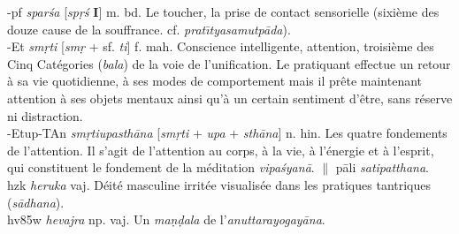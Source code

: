 \documentclass[a4paper,11pt,twocolumn]{article}
\begin{document}
{\dn -pf\0} {\em spar\'{s}a} [{\em sp\d{r}\'{s}} {\bf I}] m. bd. \og Le
toucher\fg, la prise de contact sensorielle (sixième des douze cause de
la souffrance. cf. {\em prat\={\i}tyasamutp\={a}da}). \\

{\dn -Et} {\em sm\d{r}ti} [{\em sm\d{r}} + sf. {\em ti}]
f. mah. \og Conscience intelligente, attention\fg, troisième des Cinq
Catégories ({\em bala}) de la voie de l'unification. Le
pratiquant effectue un retour à sa vie quotidienne, à ses modes de
comportement mais il prête maintenant attention à ses objets
mentaux ainsi qu'à un certain sentiment d'être, sans réserve ni
distraction. \\

{\dn -Etup-TAn} {\em sm\d{r}tiupasth\={a}na} [{\em sm\d{r}ti} +
{\em upa} + {\em sth\={a}na}] n. hin. \og Les quatre fondements de
l'attention\fg. Il s'agit de l'attention au corps, à la vie, à
l'énergie et à l'esprit, qui constituent le fondement de la méditation
{\em vipa\'{s}yan\={a}}. $\|$ p\={a}li {\em satipatthana}. \\


{\dn h\?zk} {\em heruka} vaj. Déité masculine irritée visualisée dans
les pratiques tantriques ({\em s\={a}dhana}). \\

{\dn h\?v\385w} {\em hevajra} np. vaj. Un {\em ma\d{n}\d{d}ala} de
l'{\em anuttarayogay\={a}na}. \\

\end{document}
